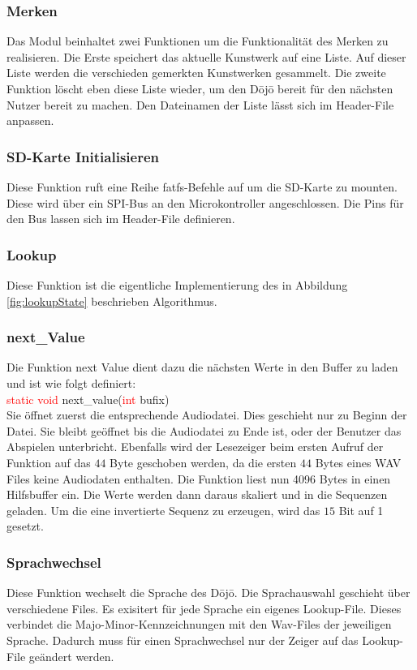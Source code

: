 \subsubsection*{Merken}
Das Modul beinhaltet zwei Funktionen um die Funktionalität des Merken zu realisieren. Die Erste speichert das aktuelle Kunstwerk auf eine Liste. Auf dieser Liste werden die verschieden gemerkten Kunstwerken gesammelt. Die zweite Funktion löscht eben diese Liste wieder, um den Dōjō bereit für den nächsten Nutzer bereit zu machen. Den Dateinamen der Liste lässt sich im Header-File anpassen.

\subsubsection*{SD-Karte Initialisieren}
Diese Funktion ruft eine Reihe fatfs-Befehle auf um die SD-Karte zu mounten. Diese wird über ein SPI-Bus an den Microkontroller angeschlossen. Die Pins für den Bus lassen sich im Header-File definieren.

\subsubsection{Lookup}
Diese Funktion ist die eigentliche Implementierung des in Abbildung \ref{fig:lookupState} beschrieben Algorithmus.

\subsubsection*{next\_Value}
Die Funktion next Value dient dazu die nächsten Werte in den Buffer zu laden und ist wie folgt definiert:\\
\textcolor{red}{static void} next\_value(\textcolor{red}{int} bufix)\\
Sie öffnet zuerst die entsprechende Audiodatei. Dies geschieht nur zu Beginn der Datei. Sie bleibt geöffnet bis die Audiodatei zu Ende ist, oder der Benutzer das Abspielen unterbricht. Ebenfalls wird der Lesezeiger beim ersten Aufruf der Funktion auf das $44$ Byte geschoben werden, da die ersten $44$ Bytes eines WAV Files keine Audiodaten enthalten. Die Funktion liest nun 4096 Bytes in einen Hilfsbuffer ein. Die Werte werden dann daraus skaliert und in die Sequenzen geladen. Um die eine invertierte Sequenz zu erzeugen, wird das $15$ Bit auf 1 gesetzt.

\subsubsection*{Sprachwechsel}
Diese Funktion wechselt die Sprache des Dōjō. Die Sprachauswahl geschieht über verschiedene Files. Es exisitert für jede Sprache ein eigenes Lookup-File. Dieses verbindet die Majo-Minor-Kennzeichnungen mit den Wav-Files der jeweiligen Sprache. Dadurch muss für einen Sprachwechsel nur der Zeiger auf das Lookup-File geändert werden.

